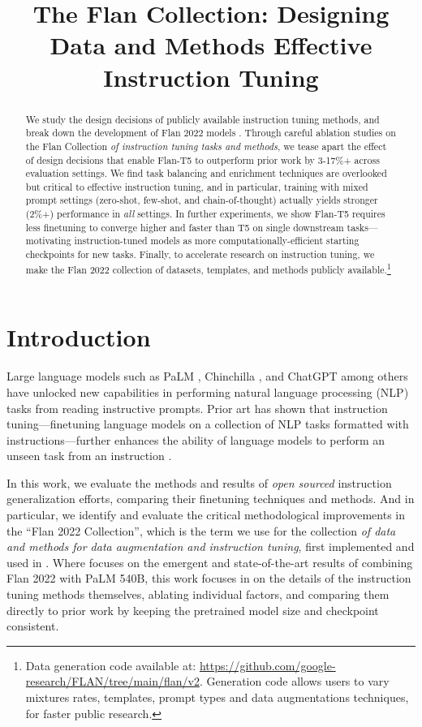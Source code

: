\title{The Flan Collection: Designing Data and Methods Effective Instruction Tuning}

\begin{abstract}

We study the design decisions of publicly available instruction tuning methods, and break down the development of Flan 2022 models \citep{chung2022scaling}. Through careful ablation studies on the Flan Collection \emph{of instruction tuning tasks and methods}, we tease apart the effect of design decisions that enable Flan-T5 to outperform prior work by 3-17\%+ across evaluation settings. We find task balancing and enrichment techniques are overlooked but critical to effective instruction tuning, and in particular, training with mixed prompt settings (zero-shot, few-shot, and chain-of-thought) actually yields stronger (2\%+) performance in \emph{all} settings. In further experiments, we show Flan-T5 requires less finetuning to converge higher and faster than T5 on single downstream tasks---motivating instruction-tuned models as more computationally-efficient starting checkpoints for new tasks. Finally, to accelerate research on instruction tuning, we make the Flan 2022 collection of datasets, templates, and methods publicly available.\footnote{Data generation code available at: \url{https://github.com/google-research/FLAN/tree/main/flan/v2}. Generation code allows users to vary mixtures rates, templates, prompt types and data augmentations techniques, for faster public research.}
\end{abstract}

\section{Introduction}

Large language models such as PaLM \citep{chowdhery2022palm}, Chinchilla \citep{hoffmann2022training}, and ChatGPT among others \citep{brown2020language,ouyang2022training} have unlocked new capabilities in performing natural language processing (NLP) tasks from reading instructive prompts. Prior art has shown that instruction tuning---finetuning language models on a collection of NLP tasks formatted with instructions---further enhances the ability of language models to perform an unseen task from an instruction \citep{wei2021finetuned, sanh2021multitask, min-etal-2022-metaicl}.

In this work, we evaluate the methods and results of \emph{open sourced} instruction generalization efforts, comparing their finetuning techniques and methods. And in particular, we identify and evaluate the critical methodological improvements in the ``Flan 2022 Collection'', which is the term we use for the collection \emph{of data and methods for data augmentation and instruction tuning}, first implemented and used in \citet{chung2022scaling}.
Where \citet{chung2022scaling} focuses on the emergent and state-of-the-art results of combining Flan 2022 with PaLM 540B, this work focuses in on the details of the instruction tuning methods themselves, ablating individual factors, and comparing them directly to prior work by keeping the pretrained model size and checkpoint consistent.


